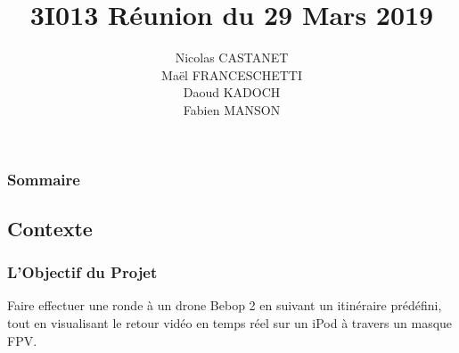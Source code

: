 \documentclass{beamer}
\title{3I013 Réunion du 29 Mars 2019}
\author{Nicolas CASTANET\\Maël FRANCESCHETTI\\Daoud KADOCH\\Fabien MANSON\\}
\begin{document}
	\begin{frame}
		\begin{center}
		\date{}
		\maketitle
		\end{center}
	\end{frame}
	
	
	
	\begin{frame}
		\section{}
		\begin{center}
		\frametitle{Sommaire}
		\tableofcontents{}
		\end{center}
	\end{frame}
	
	
	
	\begin{frame}
		\section{Contexte}
		\begin{center}
		\frametitle{L'Objectif du Projet}
		   Faire effectuer une ronde à un drone Bebop 2 en suivant un itinéraire prédéfini, tout en visualisant le retour vidéo en temps réel sur un iPod à travers un masque FPV.
		\end{center}
	\end{frame}
	
	
	
\end{document}
